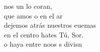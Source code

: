 \begin{cancion}%
	nos un lo coran, \\
	que amos o en el ar \\
	dejemos atrás nuestros euemas\\
	en el centro hates Tú, Sor. \\
	o haya entre noos s divisn  \\
\end{cancion}%
